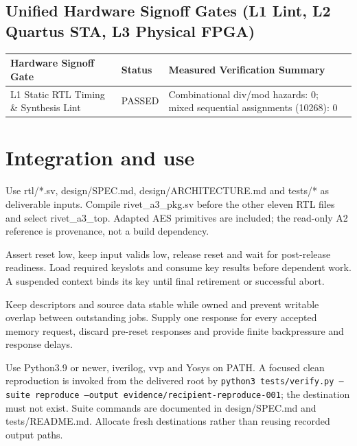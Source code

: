 \documentclass[11pt,a4paper]{article}
\begin{document}
\subsection{Unified Hardware Signoff Gates (L1 Lint, L2 Quartus STA, L3 Physical FPGA)}

{\small\renewcommand{\arraystretch}{1.18}\begin{longtable}{@{}L{0.34\textwidth}|L{0.12\textwidth}|L{0.46\textwidth}@{}}\toprule

\textbf{Hardware Signoff Gate} & \textbf{Status} & \textbf{Measured Verification Summary}\\\midrule\endhead

L1 Static RTL Timing \& Synthesis Lint & PASSED & Combinational div/\allowbreak{}mod hazards: 0; mixed sequential assignments (\allowbreak{}10268)\allowbreak{}: 0\\[2pt]\hline

\bottomrule\end{longtable}}

\section{Integration and use}

Use rtl/\allowbreak{}*\allowbreak{}.sv,\allowbreak{} design/\allowbreak{}SPEC.md,\allowbreak{} design/\allowbreak{}ARCHITECTURE.md and tests/\allowbreak{}*\allowbreak{} as deliverable inputs. Compile rivet\_\allowbreak{}a3\_\allowbreak{}pkg.sv before the other eleven RTL files and select rivet\_\allowbreak{}a3\_\allowbreak{}top. Adapted AES primitives are included; the read-only A2 reference is provenance,\allowbreak{} not a build dependency.


Assert reset low,\allowbreak{} keep input valids low,\allowbreak{} release reset and wait for post-release readiness. Load required keyslots and consume key results before dependent work. A suspended context binds its key until final retirement or successful abort.


Keep descriptors and source data stable while owned and prevent writable overlap between outstanding jobs. Supply one response for every accepted memory request,\allowbreak{} discard pre-reset responses and provide finite backpressure and response delays.


Use Python3.9 or newer,\allowbreak{} iverilog,\allowbreak{} vvp and Yosys on PATH. A focused clean reproduction is invoked from the delivered root by \texttt{python3 tests/\allowbreak{}verify.py --suite reproduce --output evidence/\allowbreak{}recipient-reproduce-001}; the destination must not exist. Suite commands are documented in design/\allowbreak{}SPEC.md and tests/\allowbreak{}README.md. Allocate fresh destinations rather than reusing recorded output paths.
\end{document}
